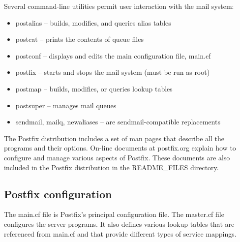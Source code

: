 \protect\hypertarget{part0026_split_060.htmlux5cux23_idIndexMarker2700}{}{}Several
command-line utilities permit user interaction with the mail system:

\begin{itemize}
\item
  \protect\hypertarget{part0026_split_060.htmlux5cux23_idIndexMarker2701}{}{}{postalias}
  -- builds, modifies, and queries alias tables
\item
  \protect\hypertarget{part0026_split_060.htmlux5cux23_idIndexMarker2702}{}{}{postcat}
  -- prints the contents of queue files
\item
  \protect\hypertarget{part0026_split_060.htmlux5cux23_idIndexMarker2703}{}{}{postconf}
  -- displays and edits the main configuration file, {main.cf}
\item
  \protect\hypertarget{part0026_split_060.htmlux5cux23_idIndexMarker2704}{}{}{postfix}
  -- starts and stops the mail system (must be run as root)
\item
  \protect\hypertarget{part0026_split_060.htmlux5cux23_idIndexMarker2705}{}{}{postmap}
  -- builds, modifies, or queries lookup tables
\item
  \protect\hypertarget{part0026_split_060.htmlux5cux23_idIndexMarker2706}{}{}{postsuper}
  -- manages mail queues
\item
  {sendmail}, {mailq}, {newaliases} -- are {sendmail}-compatible
  replacements
\end{itemize}

The Postfix distribution includes a set of man pages that describe all
the programs and their options. On-line documents at postfix.org explain
how to configure and manage various aspects of Postfix. These documents
are also included in the Postfix distribution in the {README\_FILES}
directory.

\protect\hypertarget{part0026_split_061.html}{}{}

\hypertarget{part0026_split_061.htmlux5cux23_idContainer1247}{}
\hypertarget{part0026_split_061.htmlux5cux23calibre_pb_60}{%
\subsection[Postfix
configuration]{\texorpdfstring{\protect\hypertarget{part0026_split_061.htmlux5cux23_idTextAnchor1172}{}{}Postfix
configuration}{Postfix configuration}}\label{part0026_split_061.htmlux5cux23calibre_pb_60}}

\protect\hypertarget{part0026_split_061.htmlux5cux23_idIndexMarker2707}{}{}The
\protect\hypertarget{part0026_split_061.htmlux5cux23_idIndexMarker2708}{}{}{main.cf}
file is Postfix's principal configuration file. The
\protect\hypertarget{part0026_split_061.htmlux5cux23_idIndexMarker2709}{}{}{master.cf}
file configures the server programs. It also defines various lookup
tables that are referenced from {main.cf} and that provide different
types of service mappings.


